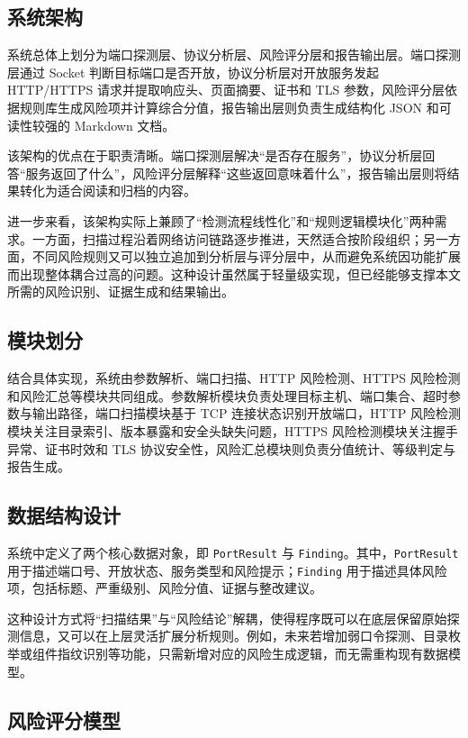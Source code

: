\documentclass[12pt,a4paper,fontset=none]{ctexart}
\begin{document}
\subsection{系统架构}

系统总体上划分为端口探测层、协议分析层、风险评分层和报告输出层。端口探测层通过 Socket 判断目标端口是否开放，协议分析层对开放服务发起 HTTP/HTTPS 请求并提取响应头、页面摘要、证书和 TLS 参数，风险评分层依据规则库生成风险项并计算综合分值，报告输出层则负责生成结构化 JSON 和可读性较强的 Markdown 文档。

该架构的优点在于职责清晰。端口探测层解决“是否存在服务”，协议分析层回答“服务返回了什么”，风险评分层解释“这些返回意味着什么”，报告输出层则将结果转化为适合阅读和归档的内容。

进一步来看，该架构实际上兼顾了“检测流程线性化”和“规则逻辑模块化”两种需求。一方面，扫描过程沿着网络访问链路逐步推进，天然适合按阶段组织；另一方面，不同风险规则又可以独立追加到分析层与评分层中，从而避免系统因功能扩展而出现整体耦合过高的问题。这种设计虽然属于轻量级实现，但已经能够支撑本文所需的风险识别、证据生成和结果输出。

\subsection{模块划分}

结合具体实现，系统由参数解析、端口扫描、HTTP 风险检测、HTTPS 风险检测和风险汇总等模块共同组成。参数解析模块负责处理目标主机、端口集合、超时参数与输出路径，端口扫描模块基于 TCP 连接状态识别开放端口，HTTP 风险检测模块关注目录索引、版本暴露和安全头缺失问题，HTTPS 风险检测模块关注握手异常、证书时效和 TLS 协议安全性，风险汇总模块则负责分值统计、等级判定与报告生成。

\subsection{数据结构设计}

系统中定义了两个核心数据对象，即 \texttt{PortResult} 与 \texttt{Finding}。其中，\texttt{PortResult} 用于描述端口号、开放状态、服务类型和风险提示；\texttt{Finding} 用于描述具体风险项，包括标题、严重级别、风险分值、证据与整改建议。

这种设计方式将“扫描结果”与“风险结论”解耦，使得程序既可以在底层保留原始探测信息，又可以在上层灵活扩展分析规则。例如，未来若增加弱口令探测、目录枚举或组件指纹识别等功能，只需新增对应的风险生成逻辑，而无需重构现有数据模型。

\subsection{风险评分模型}
\end{document}
